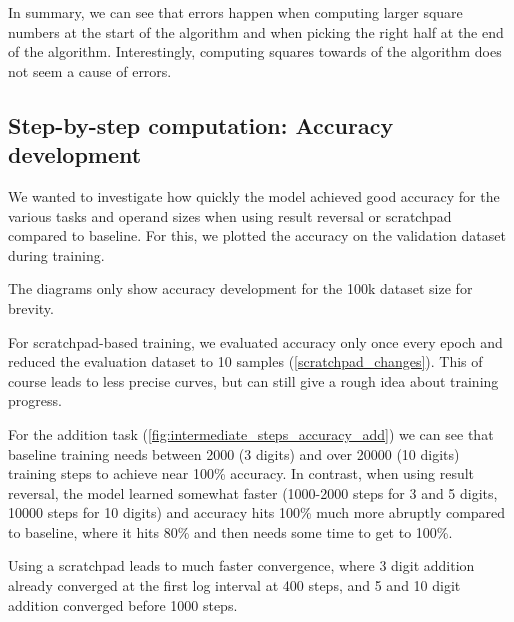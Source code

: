 In summary, we can see that errors happen when computing larger square numbers at the start of the algorithm and when picking the right half at the end of the algorithm. Interestingly, computing squares towards of the algorithm does not seem a cause of errors.


\subsection{Step-by-step computation: Accuracy development}

We wanted to investigate how quickly the model achieved good accuracy for the various tasks and operand sizes when using result reversal or scratchpad compared to baseline. For this, we plotted the accuracy on the validation dataset during training.

The diagrams only show accuracy development for the 100k dataset size for brevity.

For scratchpad-based training, we evaluated accuracy only once every epoch and reduced the evaluation dataset to 10 samples (\cref{scratchpad_changes}). This of course leads to less precise curves, but can still give a rough idea about training progress.


For the addition task (\cref{fig:intermediate_steps_accuracy_add}) we can see that baseline training needs between 2000 (3 digits) and over 20000 (10 digits) training steps to achieve near 100\% accuracy. In contrast, when using result reversal, the model learned somewhat faster (1000-2000 steps for 3 and 5 digits, 10000 steps for 10 digits) and accuracy hits 100\% much more abruptly compared to baseline, where it hits 80\% and then needs some time to get to 100\%.

Using a scratchpad leads to much faster convergence, where 3 digit addition already converged at the first log interval at 400 steps, and 5 and 10 digit addition converged before 1000 steps.





